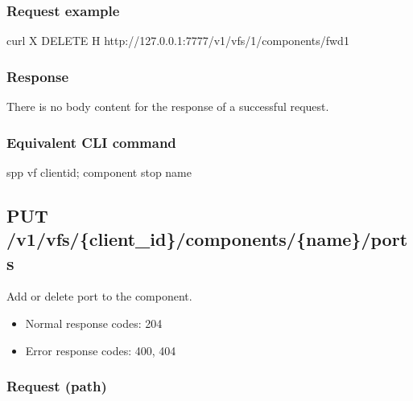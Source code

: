 \documentclass[a4paper,11pt,openany,oneside,english]{sphinxmanual}
\begin{document}
\subsubsection{Request example}
\label{\detokenize{api_ref/spp_vf:id6}}
\begin{sphinxVerbatim}[commandchars=\\\{\},formatcom=\footnotesize]
 curl \PYGZhy{}X DELETE \PYGZhy{}H  
  http://127.0.0.1:7777/v1/vfs/1/components/fwd1
\end{sphinxVerbatim}


\subsubsection{Response}
\label{\detokenize{api_ref/spp_vf:id7}}
There is no body content for the response of a successful  request.


\subsubsection{Equivalent CLI command}
\label{\detokenize{api_ref/spp_vf:id8}}
\begin{sphinxVerbatim}[commandchars=\\\{\},formatcom=\footnotesize]
spp \PYGZgt{} vf \PYGZob{}client\PYGZus{}id\PYGZcb{}; component stop \PYGZob{}name\PYGZcb{}
\end{sphinxVerbatim}


\subsection{PUT /v1/vfs/\{client\_id\}/components/\{name\}/ports}
\label{\detokenize{api_ref/spp_vf:put-v1-vfs-client-id-components-name-ports}}
Add or delete port to the component.
\begin{itemize}
\item {} 
Normal response codes: 204

\item {} 
Error response codes: 400, 404

\end{itemize}


\subsubsection{Request (path)}
\label{\detokenize{api_ref/spp_vf:id9}}
\end{document}
